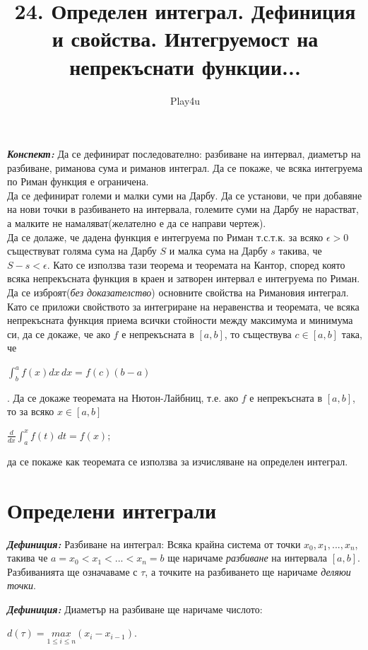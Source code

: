 \documentclass[11pt]{article} %
\title{24. Определен интеграл. Дефиниция и свойства. Интегруемост на непрекъснати функции...}
\author{Play4u}
\newcommand{\italicBold}[1]{\textbf{\emph{#1}}}
\newcommand{\definition}{\italicBold{Дефиниция: }}
\newcommand{\integral}[4]{\displaystyle \int_{#1}^{#2}#3\,#4}
\begin{document}
\maketitle

\italicBold{Конспект: } Да се дефинират последователно: разбиване на интервал, диаметър на разбиване, риманова сума и риманов интеграл. Да се покаже, че всяка интегруема по Риман функция е ограничена.\\
Да се дефинират големи и малки суми на Дарбу. Да се установи, че при добавяне на нови точки в разбиването на интервала, големите суми на Дарбу не нарастват, а малките не намаляват(желателно е да се направи чертеж).\\
Да се долаже, че дадена функция е интегруема по Риман т.с.т.к. за всяко $\epsilon > 0$ съществуват голяма сума на Дарбу $S$ и малка сума на Дарбу $s$ такива, че $S-s < \epsilon$. Като се използва тази теорема и теоремата на Кантор, според която всяка непрекъсната функция в краен и затворен интервал е интегруема по Риман. Да се изброят(\textit{без доказателство}) основните свойства на Римановия интеграл. Като се приложи свойството за интегриране на неравенства и теоремата, че всяка непрекъсната функция приема всички стойности между максимума и минимума си, да се докаже, че ако $f$ е непрекъсната в $[a,b]$, то съществува $c \in [a,b]$ така, че \\
\centerline{$\displaystyle\int_{b}^{a}f(x)dx\,dx=f(c)(b-a)$}.
Да се докаже теоремата на Нютон-Лайбниц, т.е. ако $f$ е непрекъсната в $[a,b]$, то за всяко $x \in [a,b]$\\
\centerline{$\displaystyle\frac{d}{dx}\integral{a}{x}{f(t)}{dt}=f(x)$;}
да се покаже как теоремата се използва за изчисляване на определен интеграл.

\section{Определени интеграли}

\definition Разбиване на интеграл: Всяка крайна система от точки $x_{0}, x_{1},...,x_{n}$, такива че $a = x_{0} < x_{1} < ...< x_{n} = b$ ще наричаме \textit{разбиване} на интервала $[a,b]$. Разбиванията ще означаваме с $\tau$, а точките на разбиването ще наричаме \textit{деляюи точки}. \\\par

\definition Диаметър на разбиване ще наричаме числото:\\
\centerline{$d(\tau)=\underset{1\leq i\leq n}{max}(x_{i}-x_{i-1})$.}\\\par
\end{document}
